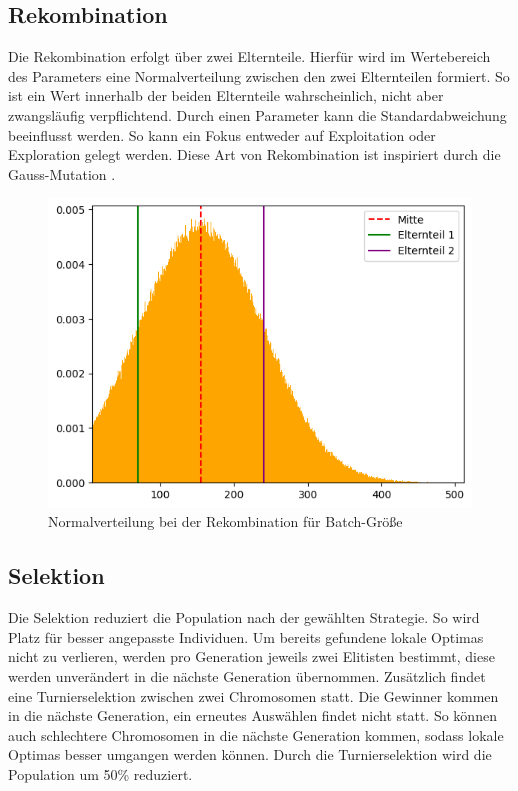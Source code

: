 \subsection{Rekombination}
Die Rekombination erfolgt über zwei Elternteile. Hierfür wird im Wertebereich des Parameters eine Normalverteilung zwischen den zwei Elternteilen formiert. So ist ein Wert innerhalb der beiden Elternteile wahrscheinlich, nicht aber zwangsläufig verpflichtend. Durch einen Parameter kann die Standardabweichung beeinflusst werden. So kann ein Fokus entweder auf Exploitation oder Exploration gelegt werden. Diese Art von Rekombination ist inspiriert durch die Gauss-Mutation \parencite[Seite~8]{kruse_evolutionare_2013}. 
\begin{figure}[h]
	\centering
	\includegraphics[width=1\linewidth]{rekombination.png}
	\caption{Normalverteilung bei der Rekombination für Batch-Größe}
	\label{fig:enter-label}
\end{figure}

\subsection{Selektion}
Die Selektion reduziert die Population nach der gewählten Strategie. So wird Platz für besser angepasste Individuen. Um bereits gefundene lokale Optimas nicht zu verlieren, werden pro Generation jeweils zwei Elitisten bestimmt, diese werden unverändert in die nächste Generation übernommen. Zusätzlich findet eine Turnierselektion zwischen zwei Chromosomen statt. Die Gewinner kommen in die nächste Generation, ein erneutes Auswählen findet nicht statt. So können auch schlechtere Chromosomen in die nächste Generation kommen, sodass lokale Optimas besser umgangen werden können. Durch die Turnierselektion wird die Population um 50\% reduziert.

